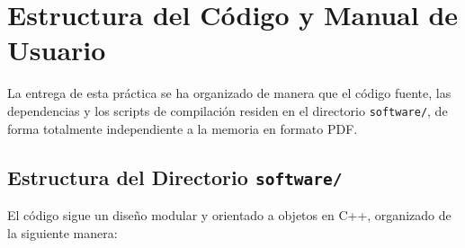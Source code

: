 \newpage
\section{Estructura del Código y Manual de Usuario}
\label{sec:manual}

La entrega de esta práctica se ha organizado de manera que el código fuente, las dependencias y los scripts de compilación residen en el directorio \texttt{software/}, de forma totalmente independiente a la memoria en formato PDF.

\subsection{Estructura del Directorio \texttt{software/}}
El código sigue un diseño modular y orientado a objetos en C++, organizado de la siguiente manera:
